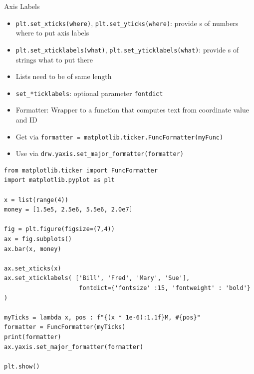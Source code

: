 \begin{frame}{Axis Labels}
%
\begin{itemize}
\item \texttt{plt.set\_xticks(where)}, \texttt{plt.set\_yticks(where)}: provide s of numbers where to put axis labels
\item \texttt{plt.set\_xticklabels(what)}, \texttt{plt.set\_yticklabels(what)}: provide s of strings what to put there
\item Lists need to be of same length
\item \texttt{set\_*ticklabels}: optional parameter \texttt{fontdict}
\item Formatter: Wrapper to a function that computes text from coordinate value and ID
\item Get via \texttt{formatter = matplotlib.ticker.FuncFormatter(myFunc)}
\item Use via \texttt{drw.yaxis.set\_major\_formatter(formatter)}
\end{itemize}
%
\end{frame}


\begin{frame}[fragile]
%
\begin{codebox}
\begin{verbatim}
from matplotlib.ticker import FuncFormatter
import matplotlib.pyplot as plt

x = list(range(4))
money = [1.5e5, 2.5e6, 5.5e6, 2.0e7]

fig = plt.figure(figsize=(7,4))
ax = fig.subplots()
ax.bar(x, money)

ax.set_xticks(x)
ax.set_xticklabels( ['Bill', 'Fred', 'Mary', 'Sue'],
                     fontdict={'fontsize' :15, 'fontweight' : 'bold'} )

myTicks = lambda x, pos : f"{(x * 1e-6):1.1f}M, #{pos}"
formatter = FuncFormatter(myTicks)
print(formatter)
ax.yaxis.set_major_formatter(formatter)

plt.show()
\end{verbatim}
\end{codebox}
%
\end{frame}



